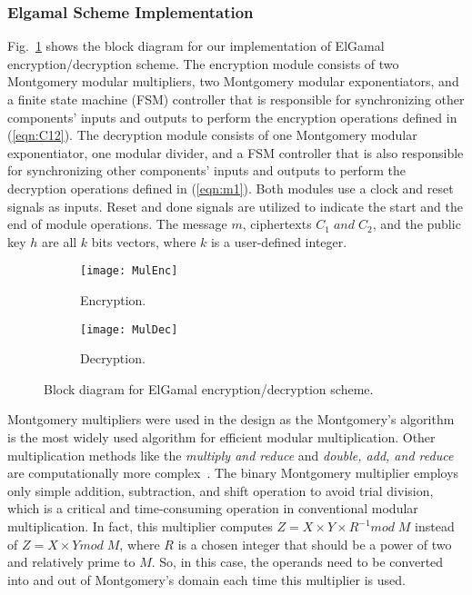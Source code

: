 \documentclass[conference]{IEEEtran}
\begin{document}
\subsubsection{\textbf{Elgamal Scheme Implementation}}

Fig.~\ref{fig:Mul} shows the block diagram for our implementation of ElGamal encryption/decryption scheme. The encryption module consists of two Montgomery modular multipliers, two Montgomery modular exponentiators, and a finite state machine (FSM) controller that is responsible for synchronizing other components' inputs and outputs to perform the encryption operations defined in (\ref{eqn:C12}). The decryption module consists of one Montgomery modular exponentiator, one modular divider, and a FSM controller that is also responsible for synchronizing other components' inputs and outputs to perform the decryption operations defined in (\ref{eqn:m1}). Both modules use a clock and reset signals as inputs. Reset and done signals are utilized to indicate the start and the end of module operations. The message $m$, ciphertexts $C_1 \; and \; C_2$, and the public key $h$ are all $k$ bits vectors, where $k$ is a user-defined integer.   

\begin{figure}
    \centering
    \begin{subfigure}[htb]{0.73\linewidth}\centering
            \texttt{[image: MulEnc]}
            \caption{Encryption.}
    \end{subfigure}
    \begin{subfigure}[htb]{0.73\linewidth}\centering
            \texttt{[image: MulDec]}
            \caption{Decryption.}
    \end{subfigure}
    \caption{Block diagram for ElGamal encryption/decryption scheme.}
    \label{fig:Mul}
\end{figure}

Montgomery multipliers were used in the design as the Montgomery's algorithm{\color{blue}~\cite{Montgomery85}} is the most widely used algorithm for efficient modular multiplication. Other multiplication methods like the \textit{multiply and reduce} and \textit{double, add, and reduce} are computationally more complex{\color{blue}~\cite{book:Deschamps09}}. The binary Montgomery multiplier employs only simple addition, subtraction, and shift operation to avoid trial division, which is a critical and time-consuming operation in conventional modular multiplication. In fact, this multiplier computes $Z = X \times Y \times R^{-1} mod \; M$ instead of $Z = X \times Y mod \; M$, where $R$ is a chosen integer that should be a power of two and relatively prime to $M$. So, in this case, the operands need to be converted into and out of Montgomery's domain each time this multiplier is used. 
\end{document}
